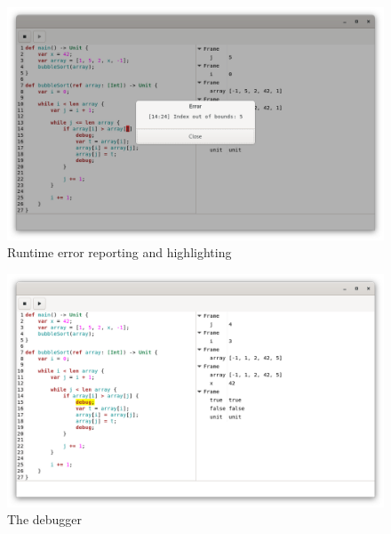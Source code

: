 \documentclass[11pt, american, draft]{PhdThesis}
\begin{document}
  \begin{figure}[H]
    \center
    \includegraphics[width=0.9\linewidth]{6.png}
    \caption{Runtime error reporting and highlighting}
  \end{figure}

  \begin{figure}[H]
    \center
    \includegraphics[width=0.9\linewidth]{5.png}
    \caption{The debugger}
  \end{figure}


  \backmatter





  \backmatter

  
  

\end{document}
